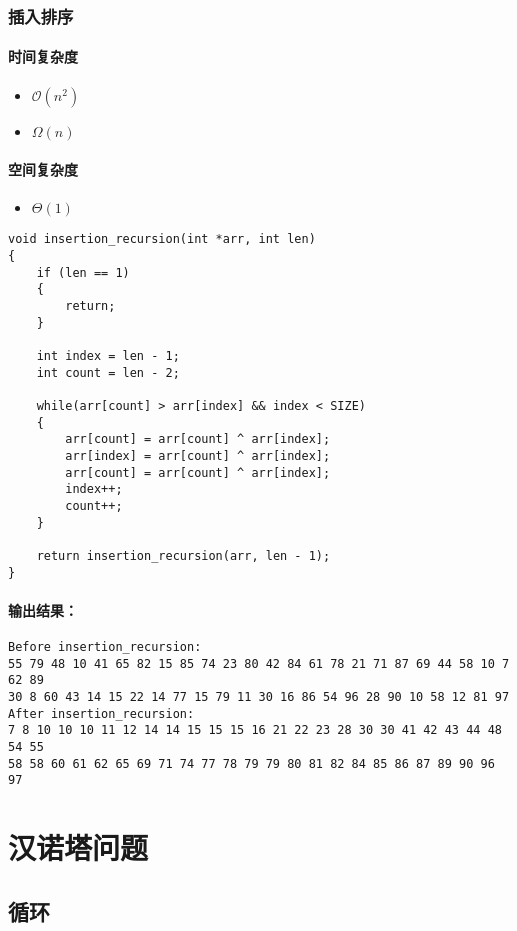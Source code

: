\documentclass[UTF8]{ctexart}
\begin{document}
\subsubsection{插入排序}
\paragraph{时间复杂度}
\begin{itemize}
	\item $\mathcal{O}(n^2)$
	\item $\Omega(n)$
\end{itemize}
\paragraph{空间复杂度}
\begin{itemize}
	\item $\Theta(1)$
\end{itemize}
\begin{lstlisting}
void insertion_recursion(int *arr, int len)
{
	if (len == 1)
	{
		return;
	}
	
	int index = len - 1;
	int count = len - 2;

	while(arr[count] > arr[index] && index < SIZE)
	{
		arr[count] = arr[count] ^ arr[index];
		arr[index] = arr[count] ^ arr[index];
		arr[count] = arr[count] ^ arr[index];
		index++;
		count++;
	}

	return insertion_recursion(arr, len - 1);
}
\end{lstlisting}
\paragraph{输出结果：}
\begin{lstlisting}
Before insertion_recursion:
55 79 48 10 41 65 82 15 85 74 23 80 42 84 61 78 21 71 87 69 44 58 10 7 62 89 
30 8 60 43 14 15 22 14 77 15 79 11 30 16 86 54 96 28 90 10 58 12 81 97 
After insertion_recursion:
7 8 10 10 10 11 12 14 14 15 15 15 16 21 22 23 28 30 30 41 42 43 44 48 54 55 
58 58 60 61 62 65 69 71 74 77 78 79 79 80 81 82 84 85 86 87 89 90 96 97
\end{lstlisting}

\section{汉诺塔问题}
\subsection{循环}
\end{document}
